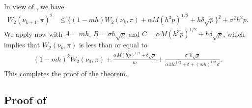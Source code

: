 \documentclass[aoap,preprint,reqno,a4paper]{imsart} %
\begin{document}
In view of , we have
\begin{align}
W_2(\nu_{k+1},\pi)^2
		&\le \big\{(1-mh)W_2(\nu_{k},\pi) +\alpha M(h^3p)^{1/2} + h\delta\sqrt{p}\big\}^2
		+ \sigma^2 h^2 p.
\end{align}
We apply now  with $A=mh$, $B=\sigma h\sqrt{p}$ and $C = \alpha M(h^3p)^{1/2}+
h\delta\sqrt{p}$, which implies that $W_2(\nu_{k},\pi) $ is less than or equal to
\begin{align}
(1-mh)^kW_2(\nu_0,\pi) + \frac{\alpha M(hp)^{1/2}+
\delta\sqrt{p}}{m} + \frac{\sigma^2 h \sqrt{p}}{\alpha Mh^{1/2}+
\delta+(mh)^{1/2}\, \sigma }.
\end{align}
This completes the proof of the theorem.

\subsection{Proof of }
\end{document}
